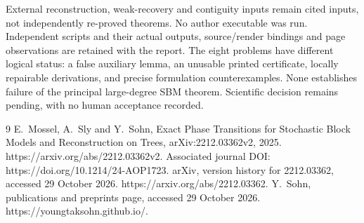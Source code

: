 \documentclass[10pt]{article}
\begin{document}
External reconstruction, weak-recovery and contiguity inputs remain cited inputs, not independently re-proved theorems. No author executable was run. Independent scripts and their actual outputs, source/render bindings and page observations are retained with the report. The eight problems have different logical status: a false auxiliary lemma, an unusable printed certificate, locally repairable derivations, and precise formulation counterexamples. None establishes failure of the principal large-degree SBM theorem. Scientific decision remains pending, with no human acceptance recorded.\par
9 E. Mossel, A. Sly and Y. Sohn, Exact Phase Transitions for Stochastic Block Models and Reconstruction on Trees, arXiv:2212.03362v2, 2025. https://arxiv.org/abs/2212.03362v2. Associated journal DOI: https://doi.org/10.1214/24-AOP1723. arXiv, version history for 2212.03362, accessed 29 October 2026. https://arxiv.org/abs/2212.03362. Y. Sohn, publications and preprints page, accessed 29 October 2026. https://youngtaksohn.github.io/.\par
\end{document}
